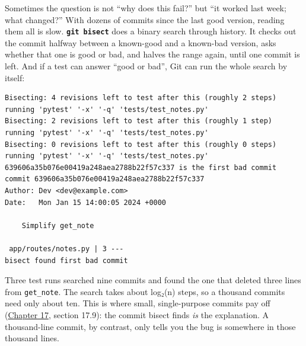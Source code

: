 Sometimes the question is not ``why does this fail?'' but ``it worked last week; what changed?'' With dozens of commits since the last good version, reading them all is slow. \textbf{\texttt{git\ bisect}} does a binary search through history. It checks out the commit halfway between a known-good and a known-bad version, asks whether that one is good or bad, and halves the range again, until one commit is left. And if a test can answer ``good or bad'', Git can run the whole search by itself:

\begin{codebox}[short]

\begin{Shaded}
\begin{Highlighting}[]
 
\end{Highlighting}
\end{Shaded}

\end{codebox}

\begin{outputbox}[short]
\begin{Verbatim}[fontsize=\codesize, breaklines, breakanywhere, breaksymbolleft={\tiny\textcolor{muted}{$\hookrightarrow$}}]
Bisecting: 4 revisions left to test after this (roughly 2 steps)
running 'pytest' '-x' '-q' 'tests/test_notes.py'
Bisecting: 2 revisions left to test after this (roughly 1 step)
running 'pytest' '-x' '-q' 'tests/test_notes.py'
Bisecting: 0 revisions left to test after this (roughly 0 steps)
running 'pytest' '-x' '-q' 'tests/test_notes.py'
639606a35b076e00419a248aea2788b22f57c337 is the first bad commit
commit 639606a35b076e00419a248aea2788b22f57c337
Author: Dev <dev@example.com>
Date:   Mon Jan 15 14:00:05 2024 +0000

    Simplify get_note

 app/routes/notes.py | 3 ---
bisect found first bad commit
\end{Verbatim}
\end{outputbox}

\noindent{}Three test runs searched nine commits and found the one that deleted three lines from \texttt{get\_note}. The search takes about log₂(n) steps, so a thousand commits need only about ten. This is where small, single-purpose commits pay off (\hyperref[ch:17-build-process]{Chapter 17}, section 17.9): the commit bisect finds \emph{is} the explanation. A thousand-line commit, by contrast, only tells you the bug is somewhere in those thousand lines.

